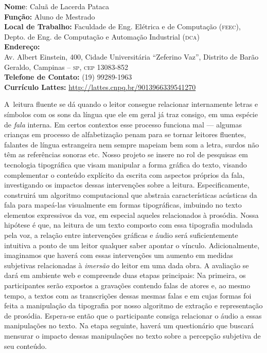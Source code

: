\documentclass[a4paper,11pt,titlepage,singlespacing]{article}
\begin{document}
\begin{titlepage}
\begin{flushleft}
    \large{\textbf{Nome}: Caluã de Lacerda Pataca }\\
    \large{\textbf{Função:} Aluno de Mestrado}\\
    \large{\textbf{Local de Trabalho:} Faculdade de Eng. Elétrica e de Computação (\textsc{feec}), \\ Depto. de Eng. de Computação e Automação Industrial (\textsc{dca})}\\
    \large{\textbf{Endereço:} \\Av. Albert Einstein, 400, Cidade Universitária ``Zeferino Vaz'', Distrito de Barão Geraldo, Campinas – \textsc{sp}, \textsc{cep} 13083-852}\\
    \large{\textbf{Telefone de Contato:} (19) 99289-1963 }\\
    \large{\textbf{Currículo Lattes:} \url{http://lattes.cnpq.br/9013966339541270}}\\
\end{flushleft}

\vspace{10pt}

\end{titlepage}

\newpage

\abstract

\noindent A~leitura fluente se dá quando o leitor consegue relacionar internamente letras e símbolos com os sons da língua que ele em geral já traz consigo, em uma espécie de \textit{fala} interna. Em certos contextos esse processo funciona mal — algumas crianças em processo de alfabetização penam para se tornar leitores fluentes, falantes de língua estrangeira nem sempre mapeiam bem som a letra, surdos não têm as referências sonoras etc. Nosso projeto se insere no rol de pesquisas em tecnologia tipográfica que visam manipular a forma gráfica do texto, visando complementar o conteúdo explícito da escrita com aspectos próprios da fala, investigando os impactos dessas intervenções sobre a leitura. Especificamente, construirá um algoritmo computacional que abstraia características acústicas da fala para mapeá-las visualmente em formas tipográficas, imbuindo no texto elementos expressivos da voz, em especial aqueles relacionados à prosódia. Nossa hipótese é que, na leitura de um texto composto com essa tipografia modulada pela voz, a relação entre intervenções gráficas e áudio será suficientemente intuitiva a ponto de um leitor qualquer saber apontar o vínculo. Adicionalmente, imaginamos que haverá com essas intervenções um aumento em medidas subjetivas relacionadas à \textit{imersão} do leitor em uma dada obra. A avaliação se dará em ambiente web e compreende duas etapas principais: Na primeira, os participantes serão expostos a gravações contendo falas de atores e, ao mesmo tempo, a textos com as transcrições dessas mesmas falas e em cujas formas foi feita a manipulação da tipografia por nosso algoritmo de extração e representação de prosódia. Espera-se então que o participante consiga relacionar o áudio a essas manipulações no texto. Na etapa seguinte, haverá um questionário que buscará mensurar o impacto dessas manipulações no texto sobre a percepção subjetiva de seu conteúdo.
\end{document}
